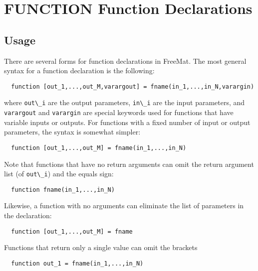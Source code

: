\section{FUNCTION Function Declarations}

\subsection{Usage}

There are several forms for function declarations in FreeMat.
The most general syntax for a function declaration is the 
following:
\begin{verbatim}
  function [out_1,...,out_M,varargout] = fname(in_1,...,in_N,varargin)
\end{verbatim}
where \verb|out\_i| are the output parameters, \verb|in\_i| are the input
parameters, and \verb|varargout| and \verb|varargin| are special keywords
used for functions that have variable inputs or outputs.  For 
functions with a fixed number of input or output parameters, the 
syntax is somewhat simpler:
\begin{verbatim}
  function [out_1,...,out_M] = fname(in_1,...,in_N)
\end{verbatim}
Note that functions that have no return arguments can omit
the return argument list (of \verb|out\_i|) and the equals sign:
\begin{verbatim}
  function fname(in_1,...,in_N)
\end{verbatim}
Likewise, a function with no arguments can eliminate the list
of parameters in the declaration:
\begin{verbatim}
  function [out_1,...,out_M] = fname
\end{verbatim}
Functions that return only a single value can omit the brackets
\begin{verbatim}
  function out_1 = fname(in_1,...,in_N)
\end{verbatim}

